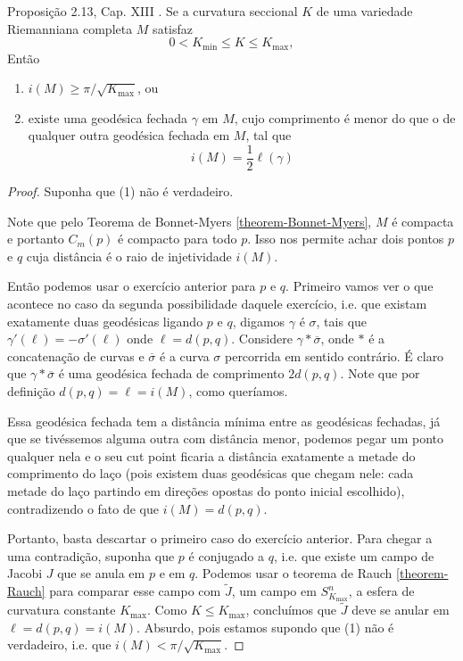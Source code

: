 \begin{exercise}
\label{exercise-l8-2}
Proposição 2.13, Cap. XIII \cite{doc}. Se a curvatura seccional $K$ de uma
variedade Riemanniana completa $M$ satisfaz
$$
0< K_{\text{min}}\leq K\leq K_{\text{max}},
$$
Então
\begin{enumerate}
\item $i(M) \geq \pi/\sqrt{K_{\text{max}}}$, ou
\item existe uma geodésica fechada $\gamma$ em $M$, cujo comprimento é menor do 
que o de qualquer outra geodésica fechada em $M$, tal que
$$
i(M)=\frac{1}{2}\ell(\gamma)
$$
\end{enumerate}
\end{exercise}

\begin{proof}
Suponha que (1) não é verdadeiro. 

Note que pelo Teorema de Bonnet-Myers 
\ref{theorem-Bonnet-Myers}, $M$ é compacta e portanto $C_m(p)$ é compacto para
todo $p$. Isso nos permite achar dois pontos $p$ e $q$ cuja distância é o raio
de injetividade  $i(M)$.

Então podemos usar o exercício anterior para $p$ e $q$.  Primeiro vamos ver o
que acontece no caso da segunda possibilidade daquele exercício, i.e. que
existam exatamente duas geodésicas ligando $p$ e $q$, digamos $\gamma$ é
$\sigma$, tais que $\gamma'(\ell)=-\sigma'(\ell)$ onde $\ell=d(p,q)$.  Considere
$\gamma * \overline{\sigma}$, onde $*$ é a concatenação de curvas e 
$\overline{\sigma}$ é a curva $\sigma$ percorrida em sentido contrário. É claro
que $\gamma * \overline{\sigma}$ é uma geodésica fechada de comprimento $2
d(p,q)$. Note que por definição  $d(p,q)=\ell=i(M)$, como queríamos.

Essa geodésica fechada tem a distância mínima entre as geodésicas fechadas, já
que se tivéssemos alguma outra com distância menor, podemos pegar um ponto
qualquer nela e o seu cut point ficaria a distância exatamente a metade do
comprimento do laço (pois existem duas geodésicas que chegam nele: cada
metade do laço partindo em direções opostas do ponto inicial escolhido),
contradizendo o fato de que $i(M)=d(p,q)$.

Portanto, basta descartar o primeiro caso do exercício anterior. Para chegar a
 uma contradição, suponha que $p $ é conjugado a $q$, i.e. que existe um campo
 de Jacobi $J$ que se anula em $p$ e em $q$. Podemos usar o teorema de Rauch
\ref{theorem-Rauch} para comparar esse campo com $\tilde{J}$, 
um campo em $S^n_{K_{\text{max}}}$, a esfera de curvatura constante
 $K_{\text{max}}$. Como $K \leq  K_{\text{max}}$,
concluímos que $\tilde{J}$ deve se anular em $\ell=d(p,q)=i(M)$. Absurdo, pois
estamos supondo que (1) não é verdadeiro, i.e. que
 $i(M) < \pi/\sqrt{K_{\text{max}}}$.
\end{proof}

